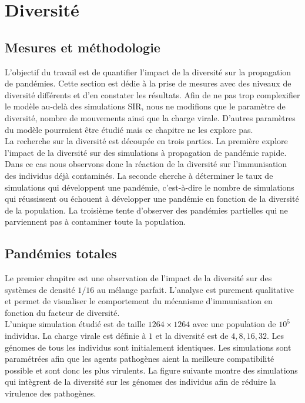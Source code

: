 \chapter{Diversité} \label{ch:DIV}

\section{Mesures et méthodologie}

L'objectif du travail est de quantifier l'impact de la diversité sur la propagation de pandémies. Cette section est dédie à la prise de mesures avec des niveaux de diversité différents et d'en constater les résultats. Afin de ne pas trop complexifier le modèle au-delà des simulations SIR, nous ne modifions que le paramètre de diversité, nombre de mouvements ainsi que la charge virale. D'autres paramètres du modèle pourraient être étudié mais ce chapitre ne les explore pas.\\

La recherche sur la diversité est découpée en trois parties. La première explore l'impact de la diversité sur des simulations à propagation de pandémie rapide. Dans ce cas nous observons donc la réaction de la diversité sur l'immunisation des individus déjà contaminés. La seconde cherche à déterminer le taux de simulations qui développent une pandémie, c'est-à-dire le nombre de simulations qui réussissent ou échouent à développer une pandémie en fonction de la diversité de la population. La troisième tente d'observer des pandémies partielles qui ne parviennent pas à contaminer toute la population.\\


\section{Pandémies totales}

Le premier chapitre est une observation de l'impact de la diversité sur des systèmes de densité $1/16$ au mélange parfait. L'analyse est purement qualitative et permet de visualiser le comportement du mécanisme d'immunisation en fonction du facteur de diversité.\\

L'unique simulation étudié est de taille $1264 \times 1264$ avec une population de $10^5$ individus. La charge virale est définie à $1$ et la diversité est de $4,8,16,32$. Les génomes de tous les individus sont initialement identiques. Les simulations sont paramétrées afin que les agents pathogènes aient la meilleure compatibilité possible et sont donc les plus virulents. La figure suivante montre des simulations qui intègrent de la diversité sur les génomes des individus afin de réduire la virulence des pathogènes.

